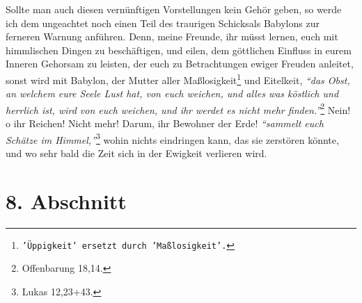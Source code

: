 \medskip

Sollte man auch diesen vernünftigen Vorstellungen kein Gehör geben, so werde ich
dem ungeachtet noch einen Teil des traurigen Schicksals Babylons zur ferneren
Warnung anführen. Denn, meine Freunde, ihr müsst lernen, euch mit himmlischen
Dingen zu beschäftigen, und eilen, dem göttlichen Einfluss in eurem Inneren
Gehorsam zu leisten, der euch zu Betrachtungen ewiger Freuden anleitet, sonst
wird mit Babylon, der Mutter aller
Maßlosigkeit\footnote{\texttt{'Üppigkeit' ersetzt durch 'Maßlosigkeit'.}} und
Eitelkeit,
\textit{"`das Obst, an
welchem eure Seele Lust hat, von euch weichen, und alles was köstlich und
herrlich ist, wird von euch weichen, und ihr werdet es nicht mehr
finden."'}\footnote{Offenbarung 18,14.}
Nein! o ihr Reichen! Nicht mehr! Darum, ihr
Bewohner der Erde!
\textit{"`sammelt euch Schätze im Himmel,"'}\footnote{Lukas 12,23+43.}
wohin nichts eindringen kann, das sie zerstören könnte, und wo sehr bald die
Zeit sich in der Ewigkeit verlieren wird.

\section{8. Abschnitt} \label{kap18_ab8}


